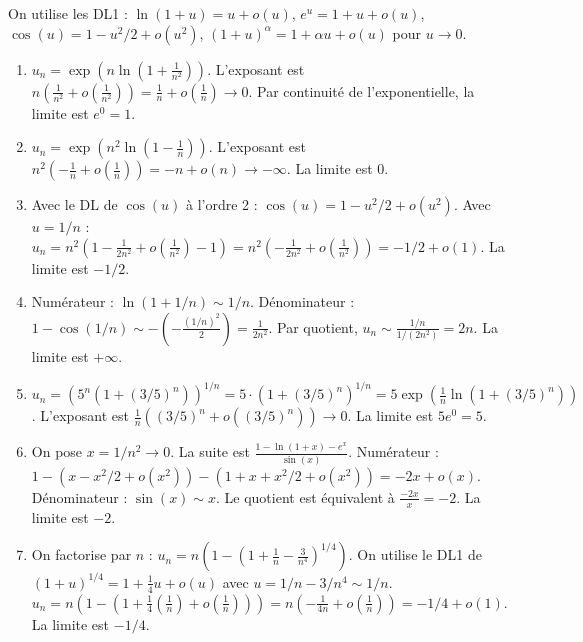 \documentclass[solutions]{exercices}
\begin{document}
\begin{solution}
	On utilise les DL1 : $\ln(1+u)=u+o(u)$, $e^u=1+u+o(u)$, $\cos(u)=1-u^2/2+o(u^2)$, $(1+u)^\alpha=1+\alpha u+o(u)$ pour $u\to 0$.
	\begin{enumerate}[label=${\alph*}_n)$]
		\item $u_n = \exp\left(n\ln(1+\frac{1}{n^2})\right)$. L'exposant est $n(\frac{1}{n^2}+o(\frac{1}{n^2})) = \frac{1}{n}+o(\frac{1}{n}) \to 0$. Par continuité de l'exponentielle, la limite est $e^0=1$.
		\item $u_n = \exp\left(n^2\ln(1-\frac{1}{n})\right)$. L'exposant est $n^2(-\frac{1}{n}+o(\frac{1}{n})) = -n+o(n) \to -\infty$. La limite est $0$.
		\item Avec le DL de $\cos(u)$ à l'ordre 2 : $\cos(u) = 1-u^2/2+o(u^2)$.
		      Avec $u=1/n$ : $u_n = n^2(1-\frac{1}{2n^2}+o(\frac{1}{n^2})-1) = n^2(-\frac{1}{2n^2}+o(\frac{1}{n^2})) = -1/2+o(1)$. La limite est $-1/2$.
		\item Numérateur : $\ln(1+1/n) \sim 1/n$. Dénominateur : $1-\cos(1/n) \sim -(-\frac{(1/n)^2}{2}) = \frac{1}{2n^2}$.
		      Par quotient, $u_n \sim \frac{1/n}{1/(2n^2)}=2n$. La limite est $+\infty$.
		\item $u_n = (5^n(1+(3/5)^n))^{1/n} = 5 \cdot (1+(3/5)^n)^{1/n} = 5 \exp\left(\frac{1}{n}\ln(1+(3/5)^n)\right)$.
		      L'exposant est $\frac{1}{n} ((3/5)^n+o((3/5)^n)) \to 0$. La limite est $5e^0 = 5$.
		\item On pose $x=1/n^2 \to 0$. La suite est $\frac{1-\ln(1+x)-e^x}{\sin(x)}$.
		      Numérateur : $1-(x-x^2/2+o(x^2))-(1+x+x^2/2+o(x^2)) = -2x+o(x)$.
		      Dénominateur : $\sin(x)\sim x$. Le quotient est équivalent à $\frac{-2x}{x} = -2$. La limite est $-2$.
		\item On factorise par $n$ : $u_n = n\left(1 - (1+\frac{1}{n}-\frac{3}{n^4})^{1/4}\right)$.
		      On utilise le DL1 de $(1+u)^{1/4} = 1+\frac{1}{4}u+o(u)$ avec $u = 1/n - 3/n^4 \sim 1/n$.
		      $u_n = n\left(1 - (1+\frac{1}{4}(\frac{1}{n}) + o(\frac{1}{n}))\right) = n(-\frac{1}{4n} + o(\frac{1}{n})) = -1/4+o(1)$. La limite est $-1/4$.
	\end{enumerate}
\end{solution}
\end{document}
